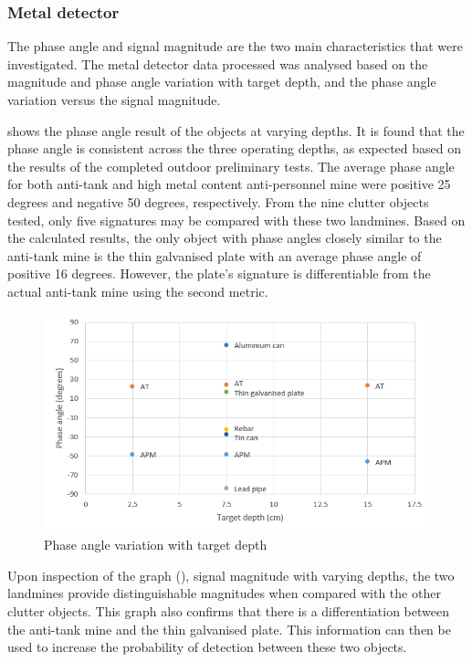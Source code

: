 \documentclass[main.tex]{subfiles}
\begin{document}
\subsubsection{Metal detector}
The phase angle and signal magnitude are the two main characteristics that were investigated. The metal detector data processed was analysed based on the magnitude and phase angle variation with target depth, and the phase angle variation versus the signal magnitude.

 shows the phase angle result of the objects at varying depths. It is found that the phase angle is consistent across the three operating depths, as expected based on the results of the completed outdoor preliminary tests. The average phase angle for both anti-tank and high metal content anti-personnel mine were positive 25 degrees and negative 50 degrees, respectively. From the nine clutter objects tested, only five signatures may be compared with these two landmines. Based on the calculated results, the only object with phase angles closely similar to the anti-tank mine is the thin galvanised plate with an average phase angle of positive 16 degrees. However, the plate’s signature is differentiable from the actual anti-tank mine using the second metric. 
\begin{figure}[ht]
\includegraphics[width=\textwidth]{5-Testing/phaseDepth.PNG}
\centering
\caption{Phase angle variation with target depth }
\end{figure}

Upon inspection of the graph (), signal magnitude with varying depths, the two landmines provide distinguishable magnitudes when compared with the other clutter objects. This graph also confirms that there is a differentiation between the anti-tank mine and the thin galvanised plate. This information can then be used to increase the probability of detection between these two objects. 
\end{document}
